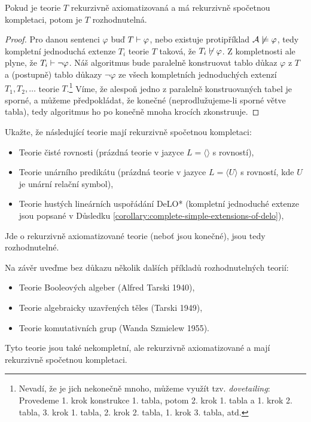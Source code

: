 \begin{proposition}\label{propositon:recursively-enumerable-completion}    
    Pokud je teorie $T$ rekurzivně axiomatizovaná a má rekurzivně spočetnou kompletaci, potom je $T$ rozhodnutelná.
\end{proposition}
\begin{proof}
Pro danou sentenci $\varphi$ buď $T\vdash\varphi$, nebo existuje protipříklad $\mathcal{A}\not\models\varphi$, tedy kompletní jednoduchá extenze $T_i$ teorie $T$ taková, že $T_i\not\vdash\varphi$. Z kompletnosti ale plyne, že $T_i\vdash\neg\varphi$. Náš algoritmus bude paralelně konstruovat tablo důkaz $\varphi$ z $T$ a (postupně) tablo důkazy $\neg\varphi$ ze všech kompletních jednoduchých extenzí $T_1,T_2,\dots$ teorie $T$.\footnote{Nevadí, že je jich nekonečně mnoho, můžeme využít tzv. \emph{dovetailing}: Provedeme 1. krok konstrukce 1. tabla, potom 2. krok 1. tabla a 1. krok 2. tabla, 3. krok 1. tabla, 2. krok 2. tabla, 1. krok 3. tabla, atd.} Víme, že alespoň jedno z paralelně konstruovaných tabel je sporné, a můžeme předpokládat, že konečné (neprodlužujeme-li sporné větve tabla), tedy algoritmus ho po konečně mnoha krocích zkonstruuje.
\end{proof}

\begin{exercise}
Ukažte, že následující teorie mají rekurzivně spočetnou kompletaci:
\begin{itemize}
\item Teorie čisté rovnosti (prázdná teorie v jazyce $L=\langle \rangle$ s rovností),
\item Teorie unárního predikátu (prázdná teorie v jazyce $L=\langle U \rangle$ s rovností, kde $U$ je unární relační symbol),
\item Teorie hustých lineárních uspořádání DeLO* (kompletní jednoduché extenze jsou popsané v Důsledku \ref{corollary:complete-simple-extensions-of-delo}),
\end{itemize}
Jde o rekurzivně axiomatizované teorie (neboť jsou konečné), jsou tedy rozhodnutelné.
\end{exercise}

\begin{example}
    Na závěr uveďme bez důkazu několik dalších příkladů rozhodnutelných teorií:
    \begin{itemize}  
        \item Teorie Booleových algeber (Alfred Tarski 1940),
        \item Teorie algebraicky uzavřených těles (Tarski 1949),
        \item Teorie komutativních grup (Wanda Szmielew 1955).
    \end{itemize}
    Tyto teorie jsou také nekompletní, ale rekurzivně axiomatizované a mají rekurzivně spočetnou kompletaci.    
\end{example}

